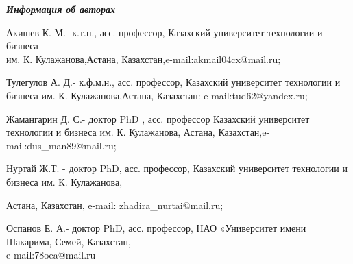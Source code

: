 \emph{{\bfseries Информация об авторах}}
\begin{noparindent}
Акишев К. М. -к.т.н., асс. профессор, Казахский университет технологии и
бизнеса \\им. К. Кулажанова,Астана, Казахстан,e-mail:akmail04cx@mail.ru;

Тулегулов А. Д.- к.ф.м.н., асс. профессор, Казахский университет
технологии и бизнеса им. К. Кулажанова,Астана, Казахстан:
e-mail:tud62@yandex.ru;

Жамангарин Д. С.- доктор PhD , асс. профессор Казахский университет
технологии и бизнеса им. К. Кулажанова, Астана,
Казахстан,e-mail:dus\_man89@mail.ru;

Нуртай Ж.Т. - доктор PhD, асс. профессор, Казахский университет
технологии и бизнеса им. К. Кулажанова,

Астана, Казахстан, e-mail: zhadira\_nurtai@mail.ru;

Оспанов Е. А.- доктор PhD, асс. профессор, НАО «Университет имени
Шакарима, Семей, Казахстан, \\e-mail:78oea@mail.ru
\end{noparindent}
